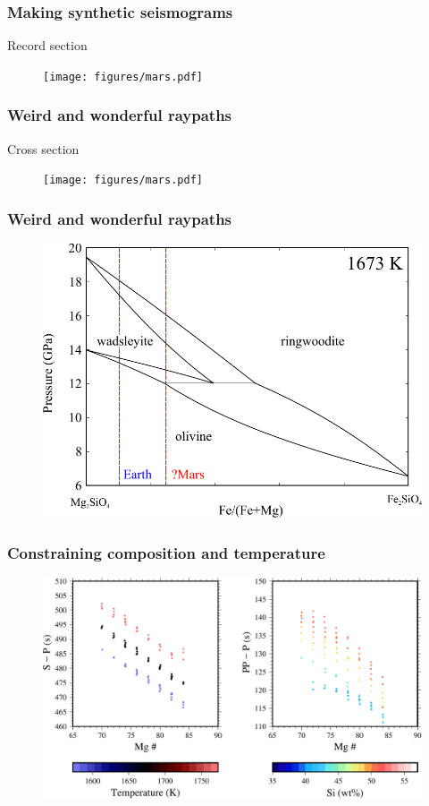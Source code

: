 \documentclass[compress,framenumber]{beamer}
\begin{document}
\begin{frame}
  \frametitle{Making synthetic seismograms}
  Record section
  \vspace{-2.0em}
  \begin{figure}
    \texttt{[image: figures/mars.pdf]}
  \end{figure}
\end{frame}

\begin{frame}
  \frametitle{Weird and wonderful raypaths}
  Cross section
  \vspace{-2.0em}
  \begin{figure}
    \texttt{[image: figures/mars.pdf]}
  \end{figure}
\end{frame}

\begin{frame}
  \frametitle{Weird and wonderful raypaths}
  \vspace{-2.0em}
  \begin{figure}
    \includegraphics[width=0.65\linewidth]{figures/ol_wad_rw}
  \end{figure}
\end{frame}

\begin{frame}
  \frametitle{Constraining composition and temperature}
  \vspace{-2.0em}
  \begin{figure}
    \includegraphics[width=0.9\linewidth]{figures/PP_SP_differential_times.pdf}
  \end{figure}
\end{frame}
\end{document}
